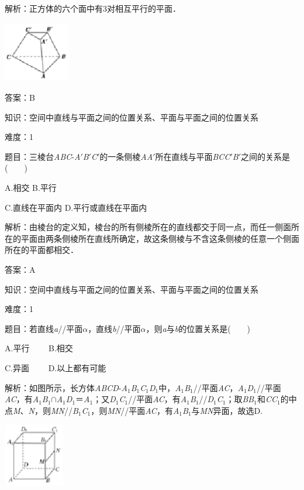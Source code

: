 \documentclass{article} %
\begin{document}
解析：正方体的六个面中有3对相互平行的平面．

\includegraphics*[width=1.14in, height=1.04in, keepaspectratio=false]{image118}

答案：B

知识：空间中直线与平面之间的位置关系、平面与平面之间的位置关系

难度：1

题目：三棱台\textit{ABC}-\textit{A}$'$\textit{B}$'$\textit{C}$'$的一条侧棱\textit{AA}$'$所在直线与平面\textit{BCC}$'$\textit{B}$'$之间的关系是(　　)

A.相交  B.平行

C.直线在平面内  D.平行或直线在平面内

解析：由棱台的定义知，棱台的所有侧棱所在的直线都交于同一点，而任一侧面所在的平面由两条侧棱所在直线所确定，故这条侧棱与不含这条侧棱的任意一个侧面所在的平面都相交．

答案：A

知识：空间中直线与平面之间的位置关系、平面与平面之间的位置关系

难度：1

题目：若直线\textit{a}//平面\textit{$\alpha$}，直线\textit{b}//平面\textit{$\alpha$}，则\textit{a}与\textit{b}的位置关系是(　　)

A.平行　　  B.相交

C.异面　　  D.以上都有可能

解析：如图所示，长方体\textit{ABCD}-\textit{A}${}_{1}$\textit{B}${}_{1}$\textit{C}${}_{1}$\textit{D}${}_{1}$中，\textit{A}${}_{1}$\textit{B}${}_{1}$//平面\textit{AC}，\textit{A}${}_{1}$\textit{D}${}_{1}$//平面\textit{AC}，有\textit{A}${}_{1}$\textit{B}${}_{1}$$\mathrm{\cap}$\textit{A}${}_{1}$\textit{D}${}_{1}$＝\textit{A}${}_{1}$；又\textit{D}${}_{1}$\textit{C}${}_{1}$//平面\textit{AC}，有\textit{A}${}_{1}$\textit{B}${}_{1}$//\textit{D}${}_{1}$\textit{C}${}_{1}$；取\textit{BB}${}_{1}$和\textit{CC}${}_{1}$的中点\textit{M}、\textit{N}，则\textit{MN}//\textit{B}${}_{1}$\textit{C}${}_{1}$，则\textit{MN}//平面\textit{AC}，有\textit{A}${}_{1}$\textit{B}${}_{1}$与\textit{MN}异面，故选D.

\includegraphics*[width=1.05in, height=1.08in, keepaspectratio=false]{image119}
\end{document}
